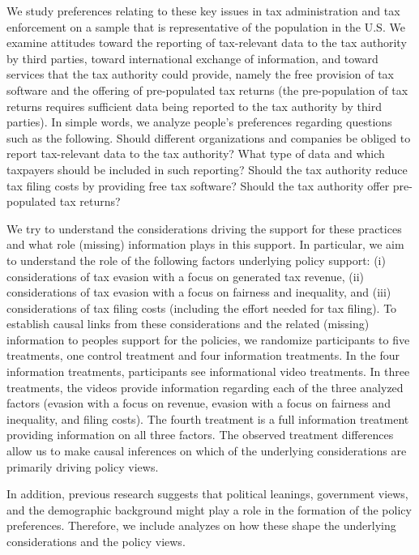 \documentclass[12pt]{article}
\begin{document}
We study preferences relating to these key issues in tax administration and tax enforcement on a sample that is representative of the population in the U.S. We examine attitudes toward the reporting of tax-relevant data to the tax authority by third parties, toward international exchange of information, and toward services that the tax authority could provide, namely the free provision of tax software and the offering of pre-populated tax returns (the pre-population of tax returns requires sufficient data being reported to the tax authority by third parties). In simple words, we analyze people's preferences regarding questions such as the following. Should different organizations and companies be obliged to report tax-relevant data to the tax authority? What type of data and which taxpayers should be included in such reporting? Should the tax authority reduce tax filing costs by providing free tax software? Should the tax authority offer pre-populated tax returns?

We try to understand the considerations driving the support for these practices and what role (missing) information plays in this support. In particular, we aim to understand the role of the following factors underlying policy support: (i) considerations of tax evasion with a focus on generated tax revenue, (ii) considerations of tax evasion with a focus on fairness and inequality, and (iii) considerations of tax filing costs (including the effort needed for tax filing). To establish causal links from these considerations and the related (missing) information to peoples support for the policies, we randomize participants to five treatments, one control treatment and four information treatments. In the four information treatments, participants see informational video treatments. In three treatments, the videos provide information regarding each of the three analyzed factors (evasion with a focus on revenue, evasion with a focus on fairness and inequality, and filing costs). The fourth treatment is a full information treatment providing information on all three factors. The observed treatment differences allow us to make causal inferences on which of the underlying considerations are primarily driving policy views. 

In addition, previous research suggests that political leanings, government views, and the demographic background might play a role in the formation of the policy preferences. Therefore, we include analyzes on how these shape the underlying considerations and the policy views. 
\end{document}
